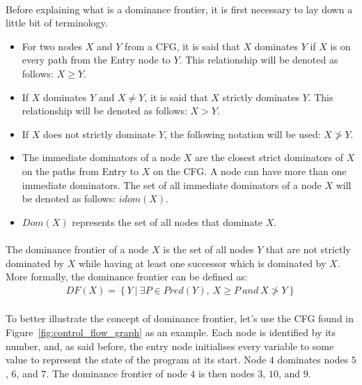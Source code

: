 \paragraph{}
Before explaining what is a dominance frontier, it is first necessary to lay down a little bit of terminology.
\begin{itemize}
	\item For two nodes $X$ and $Y$ from a CFG, it is said that $X$ dominates $Y$ if $X$ is on every path from the Entry node to $Y$. This relationship will be denoted as follows: $X \geq Y$.
	\item If $X$ dominates $Y$ and $X\neq Y$, it is said that $X$ strictly dominates $Y$. This relationship will be denoted as follows: $X > Y$.
	\item If $X$ does not strictly dominate $Y$, the following notation will be used: $X \ngtr Y$.
	\item The immediate dominators of a node $X$ are the closest strict dominators of $X$ on the paths from Entry to $X$ on the CFG. A node can have more than one immediate dominators. The set of all immediate dominators of a node $X$ will be denoted as follows: $idom(X)$.
	\item $Dom(X)$ represents the set of all nodes that dominate $X$.
\end{itemize}

\paragraph{}
The dominance frontier of a node $X$ is the set of all nodes $Y$ that are not strictly dominated by $X$ while having at least one successor which is dominated by $X$. More formally, the dominance frontier can be defined as:\\
\begin{gather*} 
DF(X) = \left\{Y\ |\ \exists P \in Pred(Y),\ X \geq P\ and\ X \ngtr Y\right\}
\end{gather*}

\paragraph{}
To better illustrate the concept of dominance frontier, let's use the CFG found in Figure~\ref{fig:control_flow_graph} as an example. Each node is identified by its number, and, as said before, the entry node initialises every variable to some value to represent the state of the program at its start. Node $4$ dominates nodes $5$, $6$, and $7$. The dominance frontier of node $4$ is then nodes $3$, $10$, and $9$.

